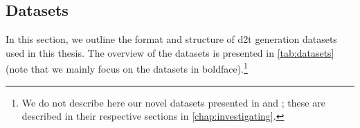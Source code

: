 {%

\subsection{Datasets}
\label{sec:datasets}

In this section, we outline the format and structure of \ac{d2t} generation datasets used in this thesis. The overview of the datasets is presented in \autoref{tab:datasets} (note that we mainly focus on the datasets in boldface).\footnote{We do not describe here our novel datasets presented in \citet{kasnerMindLabelsDescribing2022} and \citet{kasnerReferenceBasedMetricsAnalyzing2024}; these are described in their respective sections in \autoref{chap:investigating}.}

}
